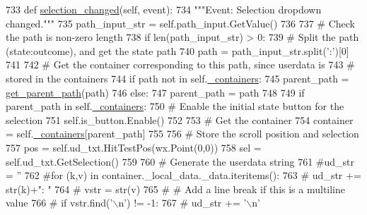 \begin{DoxyCode}
733     \textcolor{keyword}{def }\hyperlink{classsmacc__viewer_1_1SmaccViewerFrame_ad941286fc80f7a40a0adcc6ff839065c}{selection\_changed}(self, event):
734         \textcolor{stringliteral}{"""Event: Selection dropdown changed."""}
735         path\_input\_str = self.path\_input.GetValue()
736 
737         \textcolor{comment}{# Check the path is non-zero length}
738         \textcolor{keywordflow}{if} len(path\_input\_str) > 0:
739             \textcolor{comment}{# Split the path (state:outcome), and get the state path}
740             path = path\_input\_str.split(\textcolor{stringliteral}{':'})[0]
741 
742             \textcolor{comment}{# Get the container corresponding to this path, since userdata is}
743             \textcolor{comment}{# stored in the containers}
744             \textcolor{keywordflow}{if} path \textcolor{keywordflow}{not} \textcolor{keywordflow}{in} self.\hyperlink{classsmacc__viewer_1_1SmaccViewerFrame_a00ea07c6cc068340230dcac273ad5e90}{\_containers}:
745                 parent\_path = \hyperlink{namespacesmacc__viewer_a75fe995cc084c8e1bcbf45bfd7618638}{get\_parent\_path}(path)
746             \textcolor{keywordflow}{else}:
747                 parent\_path = path
748 
749             \textcolor{keywordflow}{if} parent\_path \textcolor{keywordflow}{in} self.\hyperlink{classsmacc__viewer_1_1SmaccViewerFrame_a00ea07c6cc068340230dcac273ad5e90}{\_containers}:
750                 \textcolor{comment}{# Enable the initial state button for the selection}
751                 self.is\_button.Enable()
752 
753                 \textcolor{comment}{# Get the container}
754                 container = self.\hyperlink{classsmacc__viewer_1_1SmaccViewerFrame_a00ea07c6cc068340230dcac273ad5e90}{\_containers}[parent\_path]
755 
756                 \textcolor{comment}{# Store the scroll position and selection}
757                 pos = self.ud\_txt.HitTestPos(wx.Point(0,0))
758                 sel = self.ud\_txt.GetSelection()
759 
760                 \textcolor{comment}{# Generate the userdata string}
761                 \textcolor{comment}{#ud\_str = ''}
762                 \textcolor{comment}{#for (k,v) in container.\_local\_data.\_data.iteritems():}
763                 \textcolor{comment}{#    ud\_str += str(k)+": "}
764                 \textcolor{comment}{#    vstr = str(v)}
765                 \textcolor{comment}{#    # Add a line break if this is a multiline value}
766                 \textcolor{comment}{#    if vstr.find('\(\backslash\)n') != -1:}
767                 \textcolor{comment}{#        ud\_str += '\(\backslash\)n'}

\end{DoxyCode}
